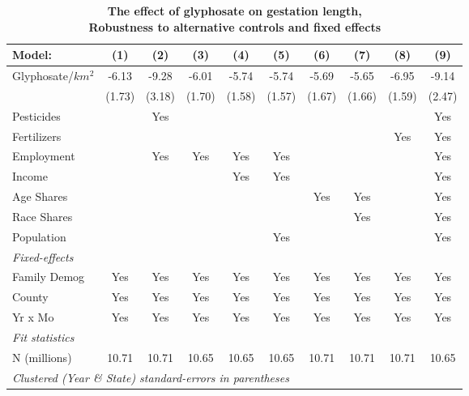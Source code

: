 \begin{table}[htbp]
   \centering
   \small
   \begin{threeparttable}[b]
      \caption{\label{tab:robust-cntrl-gestation-allyielddiffpercentilegmomax} \textbf{The effect of glyphosate on gestation length, \\ Robustness to alternative controls and fixed effects}}
      \begin{tabular}{lccccccccc}
         \toprule
         Model:            & (1)    & (2)    & (3)    & (4)    & (5)    & (6)    & (7)    & (8)    & (9)\\  
         \midrule 
         Glyphosate/$km^2$ & -6.13  & -9.28  & -6.01  & -5.74  & -5.74  & -5.69  & -5.65  & -6.95  & -9.14\\   
                           & (1.73) & (3.18) & (1.70) & (1.58) & (1.57) & (1.67) & (1.66) & (1.59) & (2.47)\\   
         Pesticides        &        & Yes    &        &        &        &        &        &        & Yes\\  
         Fertilizers       &        &        &        &        &        &        &        & Yes    & Yes\\  
         Employment        &        & Yes    & Yes    & Yes    & Yes    &        &        &        & Yes\\  
         Income            &        &        &        & Yes    & Yes    &        &        &        & Yes\\  
         Age Shares        &        &        &        &        &        & Yes    & Yes    &        & Yes\\  
         Race Shares       &        &        &        &        &        &        & Yes    &        & Yes\\  
         Population        &        &        &        &        & Yes    &        &        &        & Yes\\  
         \midrule
         \emph{Fixed-effects}\\
         Family Demog      & Yes    & Yes    & Yes    & Yes    & Yes    & Yes    & Yes    & Yes    & Yes\\  
         County            & Yes    & Yes    & Yes    & Yes    & Yes    & Yes    & Yes    & Yes    & Yes\\  
         Yr x Mo           & Yes    & Yes    & Yes    & Yes    & Yes    & Yes    & Yes    & Yes    & Yes\\  
         \midrule
         \emph{Fit statistics}\\
         N (millions)      & 10.71  & 10.71  & 10.65  & 10.65  & 10.65  & 10.71  & 10.71  & 10.71  & 10.65\\  
         \midrule
         \multicolumn{10}{l}{\emph{Clustered (Year \& State) standard-errors in parentheses}}\\
      \end{tabular}
      

\end{threeparttable}
\end{table}
